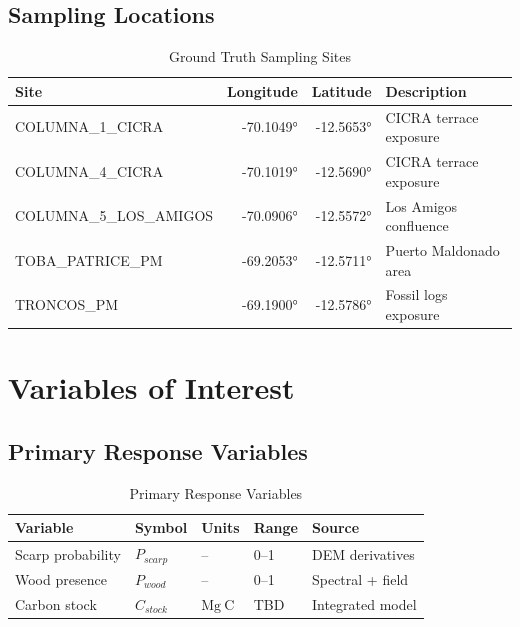\documentclass[11pt,letterpaper]{article}
\newcommand{\unit}[1]{\ensuremath{\mathrm{#1}}}
\begin{document}
\subsection{Sampling Locations}

\begin{table}[h]
\centering
\caption{Ground Truth Sampling Sites}
\label{tab:sampling_sites}
\begin{tabular}{lrrp{4cm}}
\toprule
\textbf{Site} & \textbf{Longitude} & \textbf{Latitude} & \textbf{Description} \\
\midrule
COLUMNA\_1\_CICRA & \ang{-70.1049} & \ang{-12.5653} & CICRA terrace exposure \\
COLUMNA\_4\_CICRA & \ang{-70.1019} & \ang{-12.5690} & CICRA terrace exposure \\
COLUMNA\_5\_LOS\_AMIGOS & \ang{-70.0906} & \ang{-12.5572} & Los Amigos confluence \\
TOBA\_PATRICE\_PM & \ang{-69.2053} & \ang{-12.5711} & Puerto Maldonado area \\
TRONCOS\_PM & \ang{-69.1900} & \ang{-12.5786} & Fossil logs exposure \\
\bottomrule
\end{tabular}
\end{table}

\section{Variables of Interest}
\label{sec:variables}

\subsection{Primary Response Variables}

\begin{table}[h]
\centering
\caption{Primary Response Variables}
\label{tab:response_vars}
\begin{tabular}{p{3cm}lllp{3.5cm}}
\toprule
\textbf{Variable} & \textbf{Symbol} & \textbf{Units} & \textbf{Range} & \textbf{Source} \\
\midrule
Scarp probability & $P_{scarp}$ & -- & 0--1 & DEM derivatives \\
Wood presence & $P_{wood}$ & -- & 0--1 & Spectral + field \\
Carbon stock & $C_{stock}$ & \unit{Mg~C} & TBD & Integrated model \\
\bottomrule
\end{tabular}
\end{table}
\end{document}
